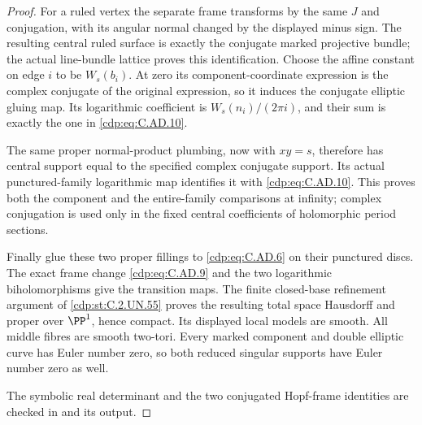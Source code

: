 \begin{proof}
For a ruled vertex the separate frame transforms by the
same $J$ and conjugation, with its angular normal changed
by the displayed minus sign. The resulting central ruled
surface is exactly the conjugate marked projective bundle;
the actual line-bundle lattice proves this identification.
Choose the affine constant on edge $i$ to be $W_s(b_i)$.
At zero its component-coordinate expression is the complex
conjugate of the original expression, so it induces the
conjugate elliptic gluing map. Its logarithmic coefficient
is $W_s(n_i)/(2\pi i)$, and their sum is exactly the one
in \eqref{cdp:eq:C.AD.10}.

The same proper normal-product plumbing, now with $xy=s$,
therefore has central support equal to the specified
complex conjugate support. Its actual punctured-family
logarithmic map identifies it with \eqref{cdp:eq:C.AD.10}. This proves
both the component and the entire-family comparisons at
infinity; complex conjugation is used only in the fixed
central coefficients of holomorphic period sections.

Finally glue these two proper fillings to \eqref{cdp:eq:C.AD.6} on
their punctured discs. The exact frame change \eqref{cdp:eq:C.AD.9}
and the two logarithmic biholomorphisms give the transition
maps. The finite closed-base refinement argument of \ref{cdp:st:C.2.UN.55}
proves the resulting total space Hausdorff and proper
over $\PP^1$, hence compact. Its displayed local models
are smooth. All middle fibres are smooth two-tori.
Every marked component and double elliptic curve has
Euler number zero, so both reduced singular supports
have Euler number zero as well.

The symbolic real determinant and the two conjugated
Hopf-frame identities are checked in
 and its output.
\end{proof}


